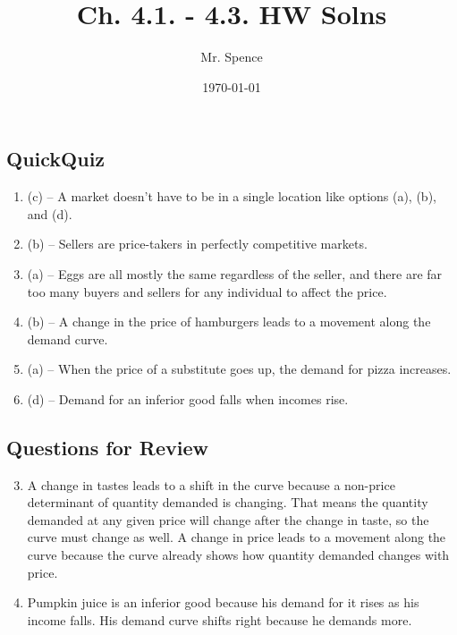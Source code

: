 \documentclass{article}
\title{Ch. 4.1. - 4.3. HW Solns}
\author{Mr. Spence}
\date{\today}
\begin{document}
\maketitle

\subsection*{QuickQuiz}

\begin{enumerate}

\item (c) -- A market doesn't have to be in a single location like options (a), (b), and (d).

\item (b) -- Sellers are price-takers in perfectly competitive markets.

\item (a) -- Eggs are all mostly the same regardless of the seller, and there are far too many buyers and sellers for any individual to affect the price. 

\item (b) -- A change in the price of hamburgers leads to a movement along the demand curve.

\item (a) -- When the price of a substitute goes up, the demand for pizza increases.

\item (d) -- Demand for an inferior good falls when incomes rise.

\end{enumerate}

\subsection*{Questions for Review}

\begin{enumerate}
\setcounter{enumi}{2}

\item A change in tastes leads to a shift in the curve because a non-price determinant of quantity demanded is changing. That means the quantity demanded at any given price will change after the change in taste, so the curve must change as well. A change in price leads to a movement along the curve because the curve already shows how quantity demanded changes with price. 

\item Pumpkin juice is an inferior good because his demand for it rises as his income falls. His demand curve shifts right because he demands more. 

\end{enumerate}
\end{document}
